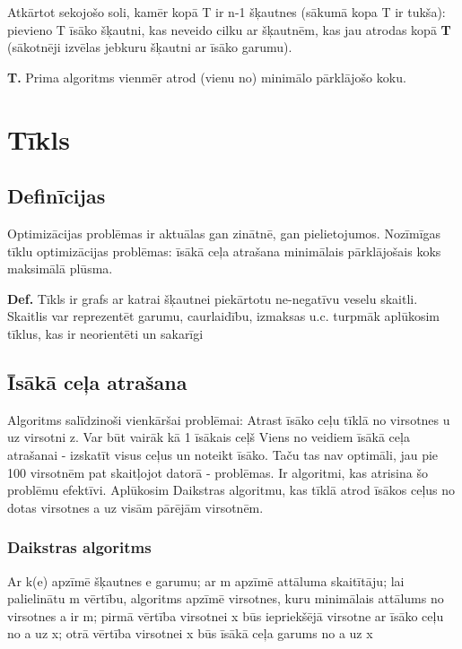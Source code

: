 \documentclass{article}
\begin{document}
Atkārtot sekojošo soli, kamēr kopā T ir n-1 šķautnes (sākumā kopa T ir tukša): pievieno T īsāko šķautni, kas neveido cilku ar šķautnēm, kas jau atrodas kopā \textbf{T  }(sākotnēji izvēlas jebkuru šķautni ar īsāko garumu).


\textbf{T. } Prima algoritms vienmēr atrod (vienu no) minimālo pārklājošo koku.

\section{Tīkls}

\subsection{Definīcijas}
Optimizācijas problēmas ir aktuālas gan zinātnē, gan pielietojumos.  Nozīmīgas tīklu optimizācijas problēmas: īsākā ceļa atrašana minimālais pārklājošais koks maksimālā plūsma.

\textbf{Def.}  Tīkls ir grafs ar katrai šķautnei piekārtotu ne-negatīvu veselu skaitli.  Skaitlis var reprezentēt garumu, caurlaidību, izmaksas u.c.  turpmāk aplūkosim tīklus, kas ir neorientēti un sakarīgi

\subsection{Īsākā ceļa atrašana}

Algoritms salīdzinoši vienkāršai problēmai:
Atrast īsāko ceļu tīklā no virsotnes u uz virsotni z. Var būt vairāk kā 1 īsākais ceļš
Viens no veidiem īsākā ceļa atrašanai - izskatīt visus ceļus un noteikt īsāko. Taču tas nav optimāli, jau pie 100 virsotnēm pat skaitļojot datorā - problēmas.
Ir algoritmi, kas atrisina šo problēmu efektīvi.  Aplūkosim Daikstras algoritmu, kas tīklā atrod īsākos ceļus no dotas virsotnes a uz visām pārējām virsotnēm.

\subsubsection{Daikstras algoritms}
Ar k(e) apzīmē šķautnes e garumu; ar m apzīmē attāluma skaitītāju; lai palielinātu m vērtību, algoritms apzīmē virsotnes, kuru minimālais attālums no virsotnes a ir m; pirmā vērtība virsotnei x būs iepriekšējā virsotne ar īsāko ceļu no a uz x; otrā vērtība virsotnei x būs īsākā ceļa garums no a uz x
\end{document}
